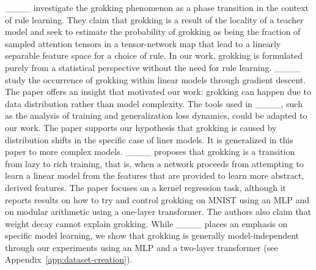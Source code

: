 ____ investigate the grokking phenomenon as a phase transition in the context of rule learning. They claim that grokking is a result of the locality of a teacher model and seek to estimate the probability of grokking as being the fraction of sampled attention tensors in a tensor-network map that lead to a linearly separable feature space for a choice of rule. In our work, grokking is formulated purely from a statistical perspective without the need for rule learning. 
____ study the occurrence of grokking within linear models through gradient descent. The paper offers an insight that motivated our work: grokking can happen due to data distribution rather than model complexity. The tools used in ____, such as the analysis of training and generalization loss dynamics, could be adapted to our work. The paper supports our hypothesis that grokking is caused by distribution shifts in the specific case of liner models. It is generalized in this paper to more complex models. %
____ proposes that grokking is a transition from lazy to rich training, that is, when a network proceeds from attempting to learn a linear model from the features that are provided to learn more abstract, derived features. The paper focuses on a kernel regression task, although it reports results on how to try and control grokking on MNIST using an MLP and on modular arithmetic using a one-layer transformer. The authors also claim that weight decay cannot explain grokking. While ____ places an emphasis on specific model learning, we show that grokking is generally model-independent through our experiments using an MLP and a two-layer transformer (see Appendix~\ref{app:dataset-creation}).




